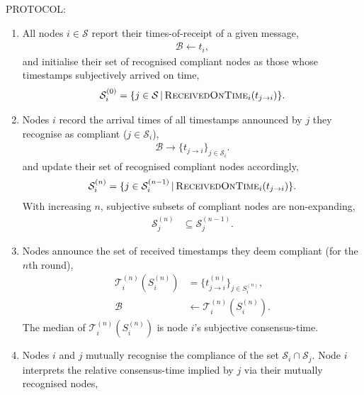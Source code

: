 PROTOCOL:
\begin{enumerate}
	\item All nodes $i\in\mathcal{S}$ report their times-of-receipt of a given message,
		\begin{align}
			\mathcal{B} \gets t_i,
		\end{align}
	 	and initialise their set of recognised compliant nodes as those whose timestamps subjectively arrived on time,
		\begin{align}
			\mathcal{S}_i^{(0)} = \{j\in\mathcal{S} \,|\, \textsc{ReceivedOnTime}_i(t_{j\to i})\}.
		\end{align}
	\item Nodes $i$ record the arrival times of all timestamps announced by $j$ they recognise as compliant ($j\in\mathcal{S}_i$),
		\begin{align}
			\mathcal{B} \to \{t_{j\to i}\}_{j\in \mathcal{S}_i}.
		\end{align}
		and update their set of recognised compliant nodes accordingly,
		\begin{align}
			\mathcal{S}_i^{(n)} = \{j\in\mathcal{S}_i^{(n-1)} \,|\, \textsc{ReceivedOnTime}_i(t_{j\to i})\}.
		\end{align}
		With increasing $n$, subjective subsets of compliant nodes are non-expanding,
		\begin{align}
			\mathcal{S}_j^{(n)} &\subseteq \mathcal{S}_j^{(n-1)}.
		\end{align}
	\item Nodes announce the set of received timestamps they deem compliant (for the $n$th round),
		\begin{align}
			\mathcal{T}_i^{(n)}(S_i^{(n)}) &= \{t_{j\to i}^{(n)}\}_{j\in S_i^{(n)}}, \nonumber\\
				\mathcal{B} &\gets \mathcal{T}_i^{(n)}(S_i^{(n)}).
		\end{align}
		The median of $\mathcal{T}_i^{(n)}(S_i^{(n)})$ is node $i$'s subjective consensus-time.
	\item Nodes $i$ and $j$ mutually recognise the compliance of the set $\mathcal{S}_i \cap \mathcal{S}_j$. Node $i$ interprets the relative consensus-time implied by $j$ via their mutually recognised nodes,

\end{enumerate}
